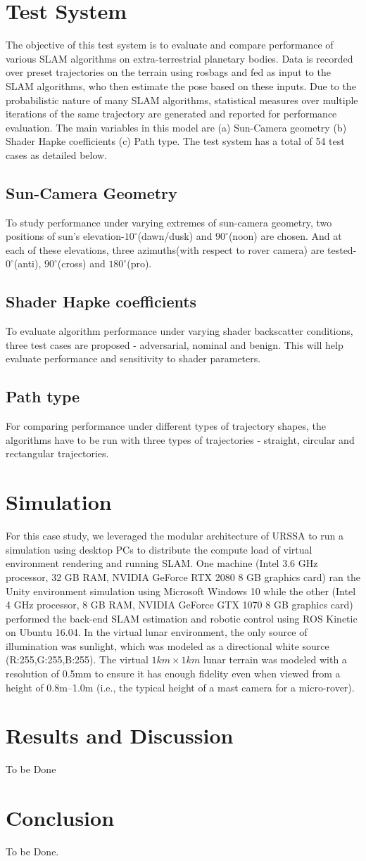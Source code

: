 \documentclass[a4paper, 10pt, conference]{ieeeconf}      %
\begin{document}
\section{Test System}
The objective of this test system is to evaluate and compare performance of various SLAM algorithms on extra-terrestrial planetary bodies. Data is recorded over preset trajectories on the terrain using rosbags and fed as input to the SLAM algorithms, who then estimate the pose based on these inputs. Due to the probabilistic nature of many SLAM algorithms, statistical measures over multiple iterations of the same trajectory are generated and reported for performance evaluation.
The main variables in this model are (a) Sun-Camera geometry (b) Shader Hapke coefficients (c) Path type. The test system has a total of 54 test cases as detailed below.
\subsection{Sun-Camera Geometry}
To study performance under varying extremes of sun-camera geometry, two positions of sun's elevation-$10^\circ$(dawn/dusk) and $90^\circ$(noon) are chosen. And at each of these elevations,  three azimuths(with respect to rover camera) are tested-$0^\circ$(anti), $90^\circ$(cross) and $180^\circ$(pro). 
\subsection{Shader Hapke coefficients}
To evaluate algorithm performance under varying shader backscatter conditions, three test cases are proposed - adversarial, nominal and benign. This will help evaluate performance and sensitivity to shader parameters.
\subsection{Path type}
For comparing performance under different types of trajectory shapes, the algorithms have to be run with three types of trajectories - straight, circular and rectangular trajectories.
\section{Simulation }
For this case study, we leveraged the modular architecture of URSSA to run a simulation using desktop PCs to distribute the compute load of virtual environment rendering and running SLAM. One machine (Intel 3.6 GHz processor, 32 GB RAM, NVIDIA GeForce RTX 2080 8 GB graphics card) ran the Unity environment simulation using Microsoft Windows 10 while the other (Intel 4 GHz processor, 8 GB RAM, NVIDIA GeForce GTX 1070 8 GB graphics card) performed the back-end SLAM estimation and robotic control using ROS Kinetic on Ubuntu 16.04. In the virtual lunar environment, the only source of illumination was sunlight, which was modeled as a directional white source (R:255,G:255,B:255). The virtual $1km\times 1km$ lunar terrain was modeled with a resolution of 0.5mm to ensure it has enough fidelity even when viewed from a height of 0.8m--1.0m (i.e., the typical height of a mast camera for a micro-rover).
\section{Results and Discussion}
To be Done
\section{Conclusion}
To be Done.



\end{document}
